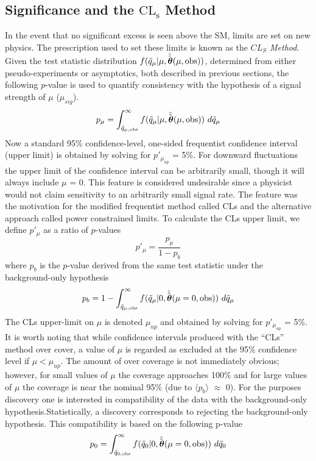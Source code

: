 \subsection{Significance and the $\mathrm{CL_{s}}$ Method}
\label{sec:stats:CLs}
In the event that no significant excess is seen above the SM, limits are set on new physics. 
The prescription used to set these limits is known as the \emph{$CL_S$ Method}.
Given the test statistic distribution $f(\tilde q_{\mu} |\mu,\hat{\vphantom{\rule{1pt}{0.1ex}}\hat{\boldsymbol{\theta}}}(\mu,\textrm{obs}))$, determined from either pseudo-experiments or asymptotics, both described in previous sections, the following $p$-value is used to quantify consistency with the hypothesis of a signal strength of $\mu$ ($\mu_{sig}$).
\begin{equation}
    p_{\mu} =\int_{\tilde q_{\mu,\textrm{obs}}}^{\infty} f(\tilde q_{\mu} |\mu,\hat{\vphantom{\rule{1pt}{0.1ex}}\hat{\boldsymbol{\theta}}}(\mu,\textrm{obs}))~d\tilde q_{\mu}
\end{equation}
Now a standard 95\% confidence-level, one-sided frequentist confidence interval (upper limit) is obtained by solving for $p'_{\mu_{up}}$ = 5\%.
For downward fluctuations the upper limit of the confidence interval can be
arbitrarily small, though it will always include $\mu$ = 0.
This feature is considered undesirable since a physicist would not claim sensitivity to an arbitrarily small signal rate.
The feature was the motivation for the modified frequentist method called CLs and the alternative approach called power constrained limits.
To calculate the CLs upper limit, we define $p'_{\mu}$ as a ratio of $p$-values
\begin{equation}
    p'_{\mu} = \frac{p_{\mu}}{1-p_{b}}
\end{equation}
where $p_{b}$ is the $p$-value derived from the same test statistic under the background-only hypothesis
\begin{equation}
    p_{b} = 1 - \int_{\tilde q_{\mu,\textrm{obs}}}^{\infty} f(\tilde q_{\mu} |0,\hat{\vphantom{\rule{1pt}{0.1ex}}\hat{\boldsymbol{\theta}}}(\mu=0,\textrm{obs}))~d\tilde q_{\mu}
\end{equation}
The CLs upper-limit on $\mu$ is denoted $\mu_{up}$ and obtained by solving for $p'_{\mu_{up}}$ = 5\%.
It is worth noting that while confidence intervals produced with the ``CLs'' method over cover, a value of $\mu$ is regarded as excluded at the 95\% confidence level if $\mu<\mu_{up}$.
The amount of over coverage is not immediately obvious; however, for small values of $\mu$ the coverage approaches 100\% and for large values of $\mu$ the coverage is near the nominal 95\% (due to $\langle p_{b} \rangle$ $\approx$ 0).
For the purposes discovery one is interested in compatibility of the data with the background-only
hypothesis.Statistically, a discovery corresponds to rejecting the background-only hypothesis.
This compatibility is based on the following p-value
\begin{equation}
    p_{0} =\int_{\tilde q_{0,\textrm{obs}}}^{\infty} f(\tilde q_{0} |0,\hat{\vphantom{\rule{1pt}{0.1ex}}\hat{\boldsymbol{\theta}}}(\mu=0,\textrm{obs}))~d\tilde q_{0}
\end{equation}

